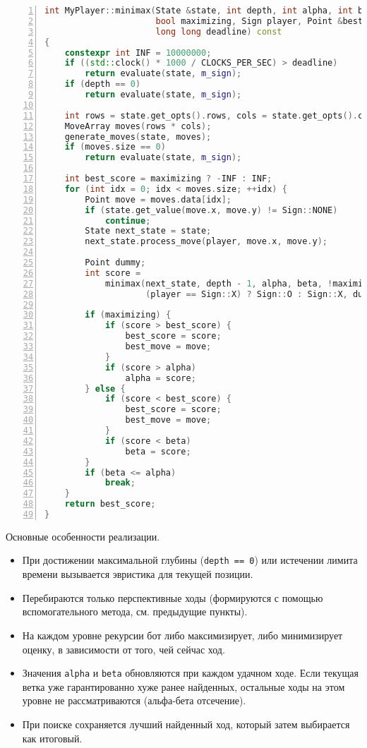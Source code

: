 \begin{lstlisting}[language=C++,caption={Рекурсивная функция Minimax с альфа-бета отсечением},label={lst:minimax},numbers=left]
int MyPlayer::minimax(State &state, int depth, int alpha, int beta,
                      bool maximizing, Sign player, Point &best_move,
                      long long deadline) const
{
    constexpr int INF = 10000000;
    if ((std::clock() * 1000 / CLOCKS_PER_SEC) > deadline)
        return evaluate(state, m_sign);
    if (depth == 0)
        return evaluate(state, m_sign);

    int rows = state.get_opts().rows, cols = state.get_opts().cols;
    MoveArray moves(rows * cols);
    generate_moves(state, moves);
    if (moves.size == 0)
        return evaluate(state, m_sign);

    int best_score = maximizing ? -INF : INF;
    for (int idx = 0; idx < moves.size; ++idx) {
        Point move = moves.data[idx];
        if (state.get_value(move.x, move.y) != Sign::NONE)
            continue;
        State next_state = state;
        next_state.process_move(player, move.x, move.y);

        Point dummy;
        int score =
            minimax(next_state, depth - 1, alpha, beta, !maximizing,
                    (player == Sign::X) ? Sign::O : Sign::X, dummy, deadline);

        if (maximizing) {
            if (score > best_score) {
                best_score = score;
                best_move = move;
            }
            if (score > alpha)
                alpha = score;
        } else {
            if (score < best_score) {
                best_score = score;
                best_move = move;
            }
            if (score < beta)
                beta = score;
        }
        if (beta <= alpha)
            break;
    }
    return best_score;
}
\end{lstlisting}

\vspace{1ex}

\noindent Основные особенности реализации.
\begin{itemize}
    \item При достижении максимальной глубины (\texttt{depth == 0}) или истечении лимита времени вызывается эвристика для текущей позиции.
    \item Перебираются только перспективные ходы (формируются с помощью вспомогательного метода, см. предыдущие пункты).
    \item На каждом уровне рекурсии бот либо максимизирует, либо минимизирует оценку, в зависимости от того, чей сейчас ход.
    \item Значения \texttt{alpha} и \texttt{beta} обновляются при каждом удачном ходе. Если текущая ветка уже гарантированно хуже ранее найденных, остальные ходы на этом уровне не рассматриваются (альфа-бета отсечение).
    \item При поиске сохраняется лучший найденный ход, который затем выбирается как итоговый.
\end{itemize}

